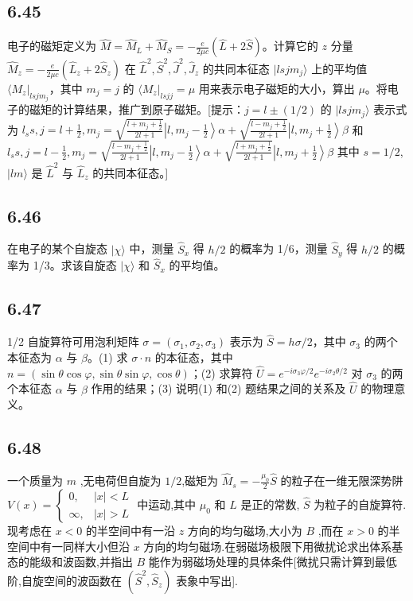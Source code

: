 \subsection{6.45}
电子的磁矩定义为 $\hat{M} = \hat{M}_L + \hat{M}_S = -\frac{e}{2\mu c}\left(\hat{L} + 2\hat{S}\right)$。计算它的 $z$ 分量 $\hat{M}_z = -\frac{e}{2\mu c}\left(\hat{L}_z + 2\hat{S}_z\right)$ 在 $\hat{L}^2, \hat{S}^2, \hat{J}^2, \hat{J}_z$ 的共同本征态 $|lsjm_j\rangle$ 上的平均值 $\langle M_z|_{lsjm_j}$，其中 $m_j = j$ 的 $\langle M_z|_{lsjj} = \mu$ 用来表示电子磁矩的大小，算出 $\mu$。将电子的磁矩的计算结果，推广到原子磁矩。[提示：$j = l \pm (1/2)$ 的 $|lsjm_j\rangle$ 表示式为 $l_s s, j = l + \frac{1}{2}, m_j = \sqrt{\frac{l + m_j + \frac{1}{2}}{2l + 1}} \left| l,m_j - \frac{1}{2} \right\rangle \alpha + \sqrt{\frac{l - m_j + \frac{1}{2}}{2l + 1}} \left| l,m_j + \frac{1}{2} \right\rangle \beta$ 和 $l_s s, j = l - \frac{1}{2}, m_j = \sqrt{\frac{l - m_j + \frac{1}{2}}{2l + 1}} \left| l,m_j - \frac{1}{2} \right\rangle \alpha + \sqrt{\frac{l + m_j + \frac{1}{2}}{2l + 1}} \left| l,m_j + \frac{1}{2} \right\rangle \beta$ 其中 $s = 1/2$, $|lm\rangle$ 是 $\hat{L}^2$ 与 $\hat{L}_z$ 的共同本征态。]

\subsection{6.46}
在电子的某个自旋态 $|\chi\rangle$ 中，测量 $\hat{S}_x$ 得 $h/2$ 的概率为 1/6，测量 $\hat{S}_y$ 得 $h/2$ 的概率为 1/3。求该自旋态 $|\chi\rangle$ 和 $\hat{S}_x$ 的平均值。

\subsection{6.47}
1/2 自旋算符可用泡利矩阵 $\sigma = (\sigma_1, \sigma_2, \sigma_3)$ 表示为 $\hat{S} = h \sigma / 2$，其中 $\sigma_3$ 的两个本征态为 $\alpha$ 与 $\beta$。(1) 求 $\sigma \cdot n$ 的本征态，其中 $n = (\sin \theta \cos \varphi, \sin \theta \sin \varphi, \cos \theta)$；(2) 求算符 $\hat{U} = e^{-i \sigma_3 \varphi / 2} e^{-i \sigma_2 \theta / 2}$ 对 $\sigma_3$ 的两个本征态 $\alpha$ 与 $\beta$ 作用的结果；(3) 说明(1) 和(2) 题结果之间的关系及 $\hat{U}$ 的物理意义。

\subsection{6.48}
一个质量为 $m$ ,无电荷但自旋为 $1/2$,磁矩为 $\hat{M}_s = -\frac{\mu_0}{2} \hat{S}$ 的粒子在一维无限深势阱 $V(x) = \begin{cases} 0, & |x| < L \\ \infty, & |x| > L \end{cases}$ 中运动,其中 $\mu_0$ 和 $L$ 是正的常数, $\hat{S}$ 为粒子的自旋算符.现考虑在 $x < 0$ 的半空间中有一沿 $z$ 方向的均匀磁场,大小为 $B$ ,而在 $x > 0$ 的半空间中有一同样大小但沿 $x$ 方向的均匀磁场.在弱磁场极限下用微扰论求出体系基态的能级和波函数,并指出 $B$ 能作为弱磁场处理的具体条件[微扰只需计算到最低阶,自旋空间的波函数在 $(\hat{S}^2, \hat{S}_z)$ 表象中写出].

